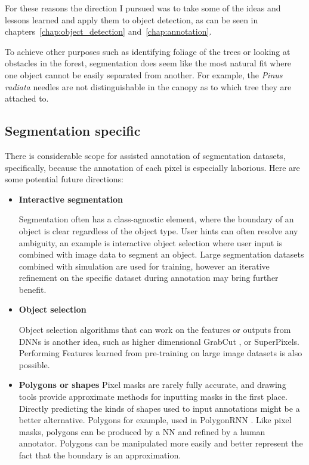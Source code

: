 For these reasons the direction I pursued was to take some of the ideas and lessons learned and apply them to object detection, as can be seen in chapters~\ref {chap:object_detection} and~\ref {chap:annotation}.

To achieve other purposes such as identifying foliage of the trees or looking at obstacles in the forest, segmentation does seem like the most natural fit where one object cannot be easily separated from another. For example, the \emph{Pinus radiata} needles are not distinguishable in the canopy as to which tree they are attached to.

\subsection{Segmentation specific}

There is considerable scope for assisted annotation of segmentation datasets, specifically, because the annotation of each pixel is especially laborious. Here are some potential future directions: 

\begin{itemize}
    
\item  {\bf Interactive segmentation} \par
Segmentation often has a class-agnostic element, where the boundary of an object is clear regardless of the object type. User hints can often resolve any ambiguity, an example is interactive object selection \cite{Xu2016, Xu2017} where user input is combined with image data to segment an object. Large segmentation datasets combined with simulation are used for training, however an iterative refinement on the specific dataset during annotation may bring further benefit.

\item  {\bf Object selection} \par
Object selection algorithms that can work on the features or outputs from \gls{DNN}s is another idea, such as higher dimensional GrabCut \cite{Xu2016a}, or SuperPixels. Performing Features learned from pre-training on large image datasets is also possible.

\item  {\bf Polygons or shapes}
Pixel masks are rarely fully accurate, and drawing tools provide approximate methods for inputting masks in the first place. Directly predicting the kinds of shapes used to input annotations might be a better alternative. Polygons for example, used in PolygonRNN \cite{Castrejon2017}. Like pixel masks, polygons can be produced by a \gls{NN} and refined by a human annotator. Polygons can be manipulated more easily and better represent the fact that the boundary is an approximation.
\end{itemize}

